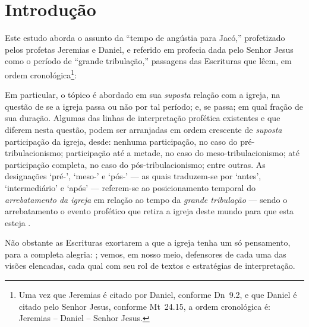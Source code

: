 \section{Introdução}

    Este estudo aborda o assunto da ``tempo de angústia para Jacó,'' profetizado pelos profetas Jeremias e Daniel, e referido em
    profecia dada pelo Senhor Jesus como o período de ``grande  tribulação,''  passagens  das  Escrituras  que  lêem,  em  ordem
    cronológica\footnote{Uma vez que Jeremias é citado por Daniel, conforme Dn~9.2, e que Daniel é citado pelo Senhor Jesus,
    conforme Mt~24.15, a ordem cronológica é: Jeremias -- Daniel -- Senhor Jesus.}:




    Em particular, o tópico é abordado em sua \emph{suposta} relação com a igreja, na questão de se a igreja passa  ou  não  por
    tal período; e, se passa; em qual fração de sua duração. Algumas das linhas de  interpretação  profética  existentes  e  que
    diferem nesta questão, podem ser arranjadas em ordem crescente de \emph{suposta}  participação  da  igreja,  desde:  nenhuma
    participação, no caso do pré-tribulacionismo; participação até a metade, no caso do meso-tribulacionismo;  até  participação
    completa, no caso do pós-tribulacionismo; entre outras. As designações `pré-', `meso-' e `pós-' --- as quais traduzem-se por
    `antes', `intermediário' e `após' --- referem-se ao posicionamento temporal do \emph{arrebatamento da igreja} em relação  ao
    tempo da \emph{grande tribulação} --- sendo o arrebatamento o evento profético que retira a igreja deste mundo para que esta
    esteja .

    Não obstante as Escrituras exortarem a que a igreja tenha um só pensamento, para a completa alegria: ; vemos, em nosso meio, defensores de cada uma das visões elencadas,  cada  qual  com  seu  rol  de
    textos e estratégias de interpretação.

